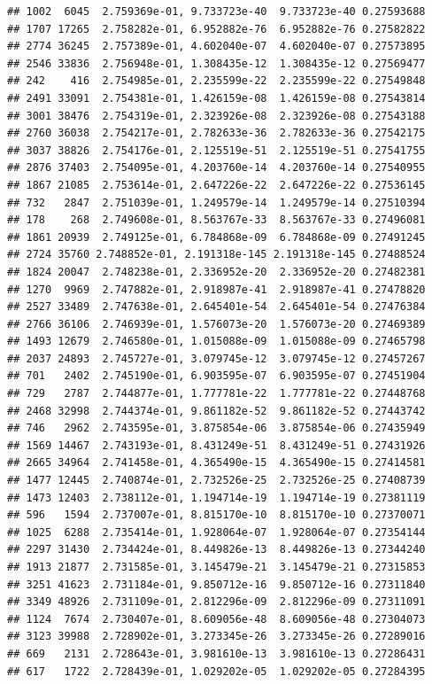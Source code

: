 \documentclass[
]{article}
\begin{document}
\begin{verbatim}
## 1002  6045  2.759369e-01, 9.733723e-40  9.733723e-40 0.27593688
## 1707 17265  2.758282e-01, 6.952882e-76  6.952882e-76 0.27582822
## 2774 36245  2.757389e-01, 4.602040e-07  4.602040e-07 0.27573895
## 2546 33836  2.756948e-01, 1.308435e-12  1.308435e-12 0.27569477
## 242    416  2.754985e-01, 2.235599e-22  2.235599e-22 0.27549848
## 2491 33091  2.754381e-01, 1.426159e-08  1.426159e-08 0.27543814
## 3001 38476  2.754319e-01, 2.323926e-08  2.323926e-08 0.27543188
## 2760 36038  2.754217e-01, 2.782633e-36  2.782633e-36 0.27542175
## 3037 38826  2.754176e-01, 2.125519e-51  2.125519e-51 0.27541755
## 2876 37403  2.754095e-01, 4.203760e-14  4.203760e-14 0.27540955
## 1867 21085  2.753614e-01, 2.647226e-22  2.647226e-22 0.27536145
## 732   2847  2.751039e-01, 1.249579e-14  1.249579e-14 0.27510394
## 178    268  2.749608e-01, 8.563767e-33  8.563767e-33 0.27496081
## 1861 20939  2.749125e-01, 6.784868e-09  6.784868e-09 0.27491245
## 2724 35760 2.748852e-01, 2.191318e-145 2.191318e-145 0.27488524
## 1824 20047  2.748238e-01, 2.336952e-20  2.336952e-20 0.27482381
## 1270  9969  2.747882e-01, 2.918987e-41  2.918987e-41 0.27478820
## 2527 33489  2.747638e-01, 2.645401e-54  2.645401e-54 0.27476384
## 2766 36106  2.746939e-01, 1.576073e-20  1.576073e-20 0.27469389
## 1493 12679  2.746580e-01, 1.015088e-09  1.015088e-09 0.27465798
## 2037 24893  2.745727e-01, 3.079745e-12  3.079745e-12 0.27457267
## 701   2402  2.745190e-01, 6.903595e-07  6.903595e-07 0.27451904
## 729   2787  2.744877e-01, 1.777781e-22  1.777781e-22 0.27448768
## 2468 32998  2.744374e-01, 9.861182e-52  9.861182e-52 0.27443742
## 746   2962  2.743595e-01, 3.875854e-06  3.875854e-06 0.27435949
## 1569 14467  2.743193e-01, 8.431249e-51  8.431249e-51 0.27431926
## 2665 34964  2.741458e-01, 4.365490e-15  4.365490e-15 0.27414581
## 1477 12445  2.740874e-01, 2.732526e-25  2.732526e-25 0.27408739
## 1473 12403  2.738112e-01, 1.194714e-19  1.194714e-19 0.27381119
## 596   1594  2.737007e-01, 8.815170e-10  8.815170e-10 0.27370071
## 1025  6288  2.735414e-01, 1.928064e-07  1.928064e-07 0.27354144
## 2297 31430  2.734424e-01, 8.449826e-13  8.449826e-13 0.27344240
## 1913 21877  2.731585e-01, 3.145479e-21  3.145479e-21 0.27315853
## 3251 41623  2.731184e-01, 9.850712e-16  9.850712e-16 0.27311840
## 3349 48926  2.731109e-01, 2.812296e-09  2.812296e-09 0.27311091
## 1124  7674  2.730407e-01, 8.609056e-48  8.609056e-48 0.27304073
## 3123 39988  2.728902e-01, 3.273345e-26  3.273345e-26 0.27289016
## 669   2131  2.728643e-01, 3.981610e-13  3.981610e-13 0.27286431
## 617   1722  2.728439e-01, 1.029202e-05  1.029202e-05 0.27284395

\end{verbatim}
\end{document}

